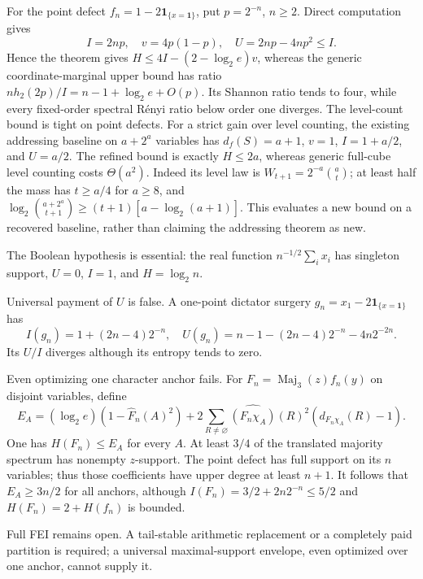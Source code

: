 \documentclass[11pt]{article}
\newcommand{\wh}{\widehat}
\begin{document}
For the point defect $f_n=1-2\mathbf1_{\{x=\mathbf1\}}$,
put $p=2^{-n}$, $n\ge2$. Direct computation gives
\[
I=2np,\quad v=4p(1-p),\quad U=2np-4np^2\le I.
\]
Hence the theorem gives $H\le4I-(2-\log_2 e)v$, whereas the
generic coordinate-marginal upper bound has ratio
$nh_2(2p)/I=n-1+\log_2 e+O(p)$. Its Shannon ratio tends to four,
while every fixed-order spectral R\'enyi ratio below order one diverges.
The level-count bound is tight on point defects. For a strict gain
over level counting, the existing addressing baseline on $a+2^a$
variables has $d_f(S)=a+1$, $v=1$, $I=1+a/2$, and $U=a/2$.
The refined bound is exactly $H\le2a$, whereas generic full-cube
level counting costs $\Theta(a^2)$. Indeed its level law is
$W_{t+1}=2^{-a}\binom at$; at least half the mass has $t\ge a/4$
for $a\ge8$, and
$\log_2\binom{a+2^a}{t+1}\ge(t+1)[a-\log_2(a+1)]$.
This evaluates a new bound on a recovered baseline, rather than
claiming the addressing theorem as new.

The Boolean hypothesis is essential: the real function
$n^{-1/2}\sum_i x_i$ has singleton support, $U=0$, $I=1$, and
$H=\log_2 n$.

Universal payment of $U$ is false. A one-point dictator surgery
$g_n=x_1-2\mathbf1_{\{x=\mathbf1\}}$ has
\[
I(g_n)=1+(2n-4)2^{-n},\quad
U(g_n)=n-1-(2n-4)2^{-n}-4n2^{-2n}.
\]
Its $U/I$ diverges although its entropy tends to zero.

Even optimizing one character anchor fails. For
$F_n=\operatorname{Maj}_3(z)f_n(y)$ on disjoint variables, define
\[
E_A=(\log_2 e)(1-\wh F_n(A)^2)+
2\sum_{R\ne\varnothing}\wh{(F_n\chi_A)}(R)^2(d_{F_n\chi_A}(R)-1).
\]
One has $H(F_n)\le E_A$ for every $A$. At least $3/4$ of the
translated majority spectrum has nonempty $z$-support. The point
defect has full support on its $n$ variables; thus those coefficients
have upper degree at least $n+1$. It follows that
$E_A\ge3n/2$ for all anchors, although
$I(F_n)=3/2+2n2^{-n}\le5/2$ and $H(F_n)=2+H(f_n)$ is bounded.

Full FEI remains open. A tail-stable arithmetic replacement or a
completely paid partition is required; a universal maximal-support
envelope, even optimized over one anchor, cannot supply it.
\end{document}
